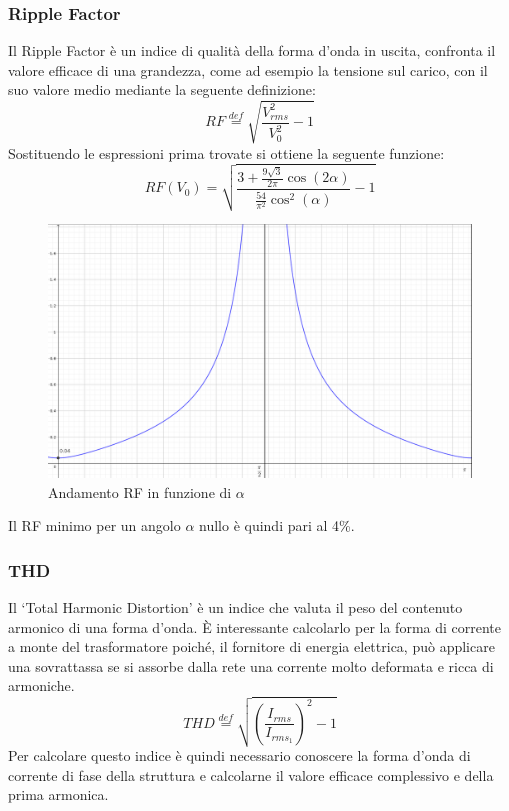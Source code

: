 \documentclass[a4paper,11pt]{article}
\begin{document}
\subsubsection{Ripple Factor}
Il Ripple Factor è un indice di qualità della forma d'onda in uscita, confronta
il valore efficace di una grandezza, come ad esempio la tensione sul carico, con il 
suo valore medio mediante la seguente definizione:
\begin{equation}
 RF \stackrel{def}{=} \sqrt{\frac{V_{rms}^2}{V_0^2}-1}
 \label{eq:ripple_factor}
\end{equation}
Sostituendo le espressioni prima trovate si ottiene la seguente funzione:
\begin{equation*}
 RF(V_0) = \sqrt{\frac{3+\frac{9\sqrt{3}}{2\pi}\cos(2\alpha)}{\frac{54}{\pi^2}\cos^2(\alpha)}-1}
\end{equation*}
\begin{figure}[H]
 \centering
 \includegraphics[keepaspectratio=true,width=0.8\linewidth]
 {RFV_0.png}
 \caption{Andamento RF in funzione di \(\alpha\)}
\end{figure}
Il RF minimo per un angolo \(\alpha\) nullo è quindi pari al 4\%.

\subsubsection{THD}
Il `Total Harmonic Distortion' è un indice che valuta il peso del contenuto armonico
di una forma d'onda. È interessante calcolarlo per la forma di corrente a monte del
trasformatore poiché, il fornitore di energia elettrica, può applicare una sovrattassa
se si assorbe dalla rete una corrente molto deformata e ricca di armoniche.
\begin{equation}
 THD \stackrel{def}{=} \sqrt{\left(\frac{I_{rms}}{I_{rms_{1}}}\right)^2-1}
 \label{eq:THD}
\end{equation}
Per calcolare questo indice è quindi necessario conoscere la forma d'onda di corrente
di fase della struttura e calcolarne il valore efficace complessivo e della prima 
armonica.
\smallskip
\end{document}
